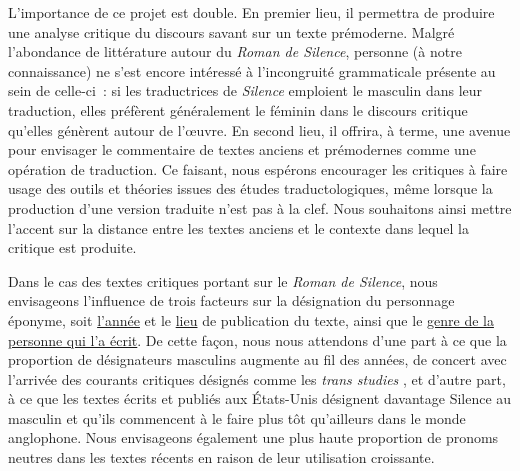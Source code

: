 \documentclass[hidelinks, 11pt, letterpaper]{article}
\begin{document}
L'importance de ce projet est double.
En premier lieu, il permettra de produire une analyse critique du discours savant sur un texte prémoderne.
Malgré l'abondance de littérature autour du \emph{Roman de Silence}, personne (à notre connaissance) ne s'est encore intéressé à l'incongruité grammaticale présente au sein de celle-ci~: si les traductrices de \emph{Silence} emploient le masculin dans leur traduction, elles préfèrent généralement le féminin dans le discours critique qu'elles génèrent autour de l'\oe uvre.
En second lieu, il offrira, à terme, une avenue pour envisager le commentaire de textes anciens et prémodernes comme une opération de traduction.
Ce faisant, nous espérons encourager les critiques à faire usage des outils et théories issues des études traductologiques, même lorsque la production d'une version traduite n'est pas à la clef.
Nous souhaitons ainsi mettre l'accent sur la distance entre les textes anciens et le contexte dans lequel la critique est produite.

Dans le cas des textes critiques portant sur le \emph{Roman de Silence}, nous envisageons l'influence de trois facteurs sur la désignation du personnage éponyme, soit \uline{l'année} et le \uline{lieu} de publication du texte, ainsi que le \uline{genre de la personne qui l'a écrit}.
De cette façon, nous nous attendons d'une part à ce que la proportion de désignateurs masculins augmente au fil des années, de concert avec l'arrivée des courants critiques désignés comme les \emph{trans studies} \parencite{Wingard2023}, et d'autre part, à ce que les textes écrits et publiés aux États-Unis désignent davantage Silence au masculin et qu'ils commencent à le faire plus tôt qu'ailleurs dans le monde anglophone.
Nous envisageons également une plus haute proportion de pronoms neutres dans les textes récents en raison de leur utilisation croissante.
\end{document}
